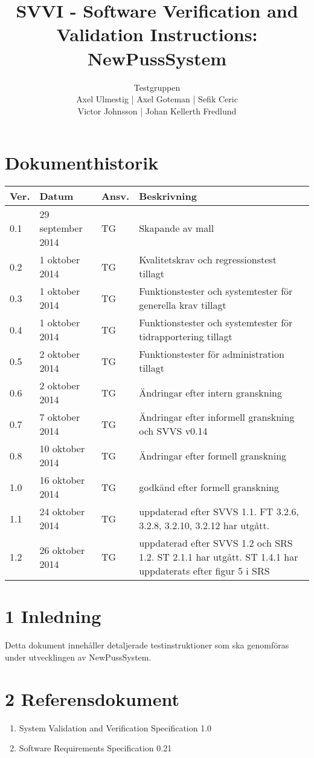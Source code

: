 \documentclass[a4paper]{article}
\title{SVVI - Software Verification and Validation Instructions: NewPussSystem}
\author{Testgruppen \\ Axel Ulmestig | Axel Goteman | Sefik Ceric \\ Victor Johnsson | Johan Kellerth Fredlund}
\date{}
\begin{document}
\maketitle
\thispagestyle{fancy}
\tableofcontents
\newpage

\section*{Dokumenthistorik}

\begin{tabular}{ l l l p{9cm} }
Ver. & Datum & Ansv. & Beskrivning \\\hline
0.1 & 29 september 2014 & TG & Skapande av mall \\
0.2 & 1 oktober 2014 & TG & Kvalitetskrav och regressionstest tillagt \\
0.3 & 1 oktober 2014 & TG & Funktionstester och systemtester för generella krav tillagt\\
0.4 & 1 oktober 2014 & TG & Funktionstester och systemtester för tidrapportering tillagt\\
0.5 & 2 oktober 2014 & TG & Funktionstester för administration tillagt\\
0.6 & 2 oktober 2014 & TG & Ändringar efter intern granskning\\
0.7 & 7 oktober 2014 & TG & Ändringar efter informell granskning och SVVS v0.14\\
0.8 & 10 oktober 2014 & TG & Ändringar efter formell granskning\\
1.0 & 16 oktober 2014 & TG & godkänd efter formell granskning\\
1.1 & 24 oktober 2014 & TG & uppdaterad efter SVVS 1.1. FT 3.2.6, 3.2.8, 3.2.10, 3.2.12 har utgått. \\
1.2 & 26 oktober 2014 & TG & uppdaterad efter SVVS 1.2 och SRS 1.2. ST 2.1.1 har utgått. ST 1.4.1 har uppdaterats efter figur 5 i SRS\\

\end{tabular}
\section{1 Inledning}       

Detta dokument innehåller detaljerade testinstruktioner som ska genomföras under utvecklingen av NewPussSystem.

\section{2 Referensdokument}
\begin{enumerate}
\item System Validation and Verification Specification 1.0
\item Software Requirements Specification 0.21
\end{enumerate}
\end{document}

